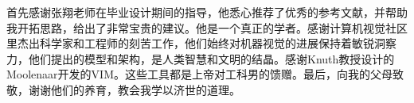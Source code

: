 首先感谢张翔老师在毕业设计期间的指导，他悉心推荐了优秀的参考文献，并帮助我开拓思路，给出了非常宝贵的建议。他是一个真正的学者。感谢计算机视觉社区里杰出科学家和工程师的刻苦工作，他们始终对机器视觉的进展保持着敏锐洞察力，他们提出的模型和架构，是人类智慧和文明的结晶。感谢Knuth教授设计的 Moolenaar开发的VIM。这些工具都是上帝对工科男的馈赠。最后，向我的父母致敬，谢谢他们的养育，教会我学以济世的道理。
